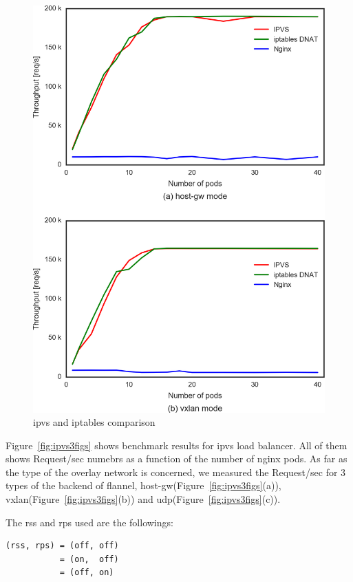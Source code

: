\begin{figure}
\includegraphics[width=\columnwidth]{Figs/ipvs-iptables-nginx_2figs}
\caption{ipvs and iptables comparison}
\label{fig:ipvs-iptables-nginx_2figs}
\end{figure}

Figure~\ref{fig:ipvs3figs} shows benchmark results for ipvs load balancer. 
All of them shows Request/sec numebrs as a function of the number of nginx pods.
As far as the type of the overlay network is concerned, we measured the Request/sec for 3 types of the backend of flannel, 
host-gw(Figure~\ref{fig:ipvs3figs}(a)), vxlan(Figure~\ref{fig:ipvs3figs}(b)) and udp(Figure~\ref{fig:ipvs3figs}(c)).

The rss and rps used are the followings: 

\begin{center}
\begin{minipage}{0.8\columnwidth}
\begin{verbatim}
(rss, rps) = (off, off)
           = (on,  off)
           = (off, on)
\end{verbatim}
\end{minipage}
\end{center}

